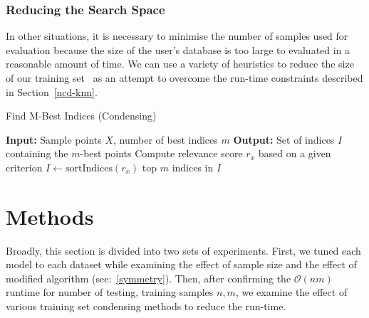 \documentclass[conference]{IEEEtran}
\begin{document}
\subsubsection{Reducing the Search Space}
\label{condensing_methods}
In other situations, it is necessary to minimise the number of samples used for evaluation because the size of the user's database is too large to evaluated in a reasonable amount of time. We can use a variety of heuristics to reduce the size of our training set~\cite{amal2011survey} as an attempt to overcome the run-time constraints described in Section~\ref{ncd-knn}.



\begin{algorithm}
  \caption{Find M-Best Indices (Condensing)}
  \label{alg:m-best-indices}
  \begin{algorithmic}
    \State \textbf{Input:} Sample points $X$, number of best indices $m$
    \State \textbf{Output:} Set of indices $I$ containing the $m$-best points
      \State Compute relevance score $r_x$ based on a given criterion
    \State $I \gets \text{sortIndices}(r_x)$
    \State \Return top $m$ indices in $I$
  \end{algorithmic}
\end{algorithm}










\section{Methods}
Broadly, this section is divided into two sets of experiments. First, we tuned each model to each dataset while examining the effect of sample size and the effect of modified algorithm (see:~\ref{symmetry}). Then, after confirming the $\mathcal{O}(nm)$ runtime for number of testing, training samples $n,m$, we examine the effect of various training set condensing methods to reduce the run-time. 
\end{document}
